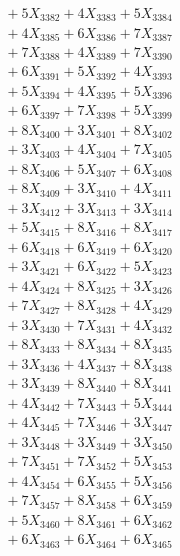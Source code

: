 \documentclass[a4paper,10pt]{article}
\begin{document}
{\begin{align}
&\;  + 5 X_{3382} + 4 X_{3383} + 5 X_{3384} \\[0.3ex]
&\;  + 4 X_{3385} + 6 X_{3386} + 7 X_{3387} \\[0.3ex]
&\;  + 7 X_{3388} + 4 X_{3389} + 7 X_{3390} \\[0.3ex]
&\;  + 6 X_{3391} + 5 X_{3392} + 4 X_{3393} \\[0.3ex]
&\;  + 5 X_{3394} + 4 X_{3395} + 5 X_{3396} \\[0.3ex]
&\;  + 6 X_{3397} + 7 X_{3398} + 5 X_{3399} \\[0.5ex]\allowbreak
&\;  + 8 X_{3400} + 3 X_{3401} + 8 X_{3402} \\[0.3ex]
&\;  + 3 X_{3403} + 4 X_{3404} + 7 X_{3405} \\[0.3ex]
&\;  + 8 X_{3406} + 5 X_{3407} + 6 X_{3408} \\[0.3ex]
&\;  + 8 X_{3409} + 3 X_{3410} + 4 X_{3411} \\[0.3ex]
&\;  + 3 X_{3412} + 3 X_{3413} + 3 X_{3414} \\[0.3ex]
&\;  + 5 X_{3415} + 8 X_{3416} + 8 X_{3417} \\[0.3ex]
&\;  + 6 X_{3418} + 6 X_{3419} + 6 X_{3420} \\[0.3ex]
&\;  + 3 X_{3421} + 6 X_{3422} + 5 X_{3423} \\[0.3ex]
&\;  + 4 X_{3424} + 8 X_{3425} + 3 X_{3426} \\[0.3ex]
&\;  + 7 X_{3427} + 8 X_{3428} + 4 X_{3429} \\[0.5ex]\allowbreak
&\;  + 3 X_{3430} + 7 X_{3431} + 4 X_{3432} \\[0.3ex]
&\;  + 8 X_{3433} + 8 X_{3434} + 8 X_{3435} \\[0.3ex]
&\;  + 3 X_{3436} + 4 X_{3437} + 8 X_{3438} \\[0.3ex]
&\;  + 3 X_{3439} + 8 X_{3440} + 8 X_{3441} \\[0.3ex]
&\;  + 4 X_{3442} + 7 X_{3443} + 5 X_{3444} \\[0.3ex]
&\;  + 4 X_{3445} + 7 X_{3446} + 3 X_{3447} \\[0.3ex]
&\;  + 3 X_{3448} + 3 X_{3449} + 3 X_{3450} \\[0.3ex]
&\;  + 7 X_{3451} + 7 X_{3452} + 5 X_{3453} \\[0.3ex]
&\;  + 4 X_{3454} + 6 X_{3455} + 5 X_{3456} \\[0.3ex]
&\;  + 7 X_{3457} + 8 X_{3458} + 6 X_{3459} \\[0.5ex]\allowbreak
&\;  + 5 X_{3460} + 8 X_{3461} + 6 X_{3462} \\[0.3ex]
&\;  + 6 X_{3463} + 6 X_{3464} + 6 X_{3465} \\[0.3ex]

\end{align}}
\end{document}

